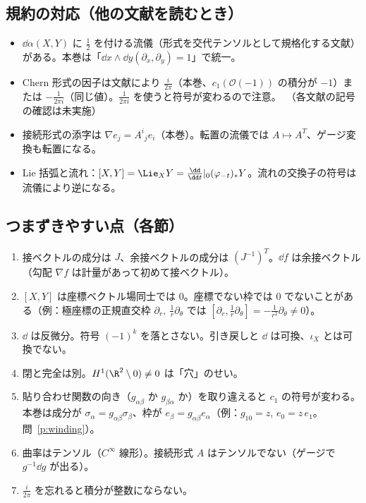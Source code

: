 \subsection*{規約の対応（他の文献を読むとき）}
\begin{itemize}
\item $\dd\alpha(X,Y)$ に $\frac12$ を付ける流儀（形式を交代テンソルとして規格化する文献）がある。本巻は「$\dd x\wedge\dd y(\partial_x,\partial_y)=1$」で統一。
\item Chern 形式の因子は文献により $\frac i{2\pi}$（本巻、$c_1(\mathcal O(-1))$ の積分が $-1$）または $-\frac1{2\pi i}$（同じ値）。$\frac{1}{2\pi i}$ を使うと符号が変わるので注意。\tQ\ （各文献の記号の確認は未実施）
\item 接続形式の添字は $\nabla e_j=A^i{}_je_i$（本巻）。転置の流儀では $A\mapsto A^T$、ゲージ変換も転置になる。
\item Lie 括弧と流れ：$[X,Y]=\Lie_XY=\frac{\dd}{\dd t}|_0(\varphi_{-t})_*Y$。流れの交換子の符号は流儀により逆になる。
\end{itemize}

\subsection*{つまずきやすい点（各節）}
\begin{enumerate}
\item 接ベクトルの成分は $J$、余接ベクトルの成分は $(J^{-1})^T$。$\dd f$ は余接ベクトル（勾配 $\nabla f$ は計量があって初めて接ベクトル）。
\item $[X,Y]$ は座標ベクトル場同士では $0$。座標でない枠では $0$ でないことがある（例：極座標の正規直交枠 $\partial_r,\ \frac1r\partial_\theta$ では $[\partial_r,\tfrac1r\partial_\theta]=-\tfrac1{r^2}\partial_\theta\ne0$）。
\item $\dd$ は反微分。符号 $(-1)^k$ を落とさない。引き戻しと $\dd$ は可換、$\iota_X$ とは可換でない。
\item 閉と完全は別。$H^1(\R^2\setminus0)\ne0$ は「穴」のせい。
\item 貼り合わせ関数の向き（$g_{\alpha\beta}$ か $g_{\beta\alpha}$ か）を取り違えると $c_1$ の符号が変わる。本巻は成分が $\sigma_\alpha=g_{\alpha\beta}\sigma_\beta$、枠が $e_\beta=g_{\alpha\beta}e_\alpha$（例：$g_{10}=z$, $e_0=z\,e_1$。問~\ref{p:winding}）。
\item 曲率はテンソル（$C^\infty$ 線形）。接続形式 $A$ はテンソルでない（ゲージで $g^{-1}\dd g$ が出る）。
\item $\frac i{2\pi}$ を忘れると積分が整数にならない。
\end{enumerate}

